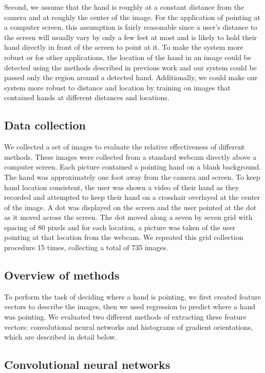 \documentclass[10pt,twocolumn,letterpaper]{article}
\begin{document}
Second, we assume that the hand is roughly at a constant distance from the camera and at roughly the center of the image.  For the application of pointing at a computer screen, this assumption is fairly reasonable since a user's distance to the screen will usually vary by only a few feet at most and is likely to hold their hand directly in front of the screen to point at it.  To make the system more robust or for other applications, the location of the hand in an image could be detected using the methods described in previous work and our system could be passed only the region around a detected hand.  Additionally, we could make our system more robust to distance and location by training on images that contained hands at different distances and locations.

\subsection{Data collection}

We collected a set of images to evaluate the relative effectiveness of different methods.  These images were collected from a standard webcam directly above a computer screen.  Each picture contained a pointing hand on a blank background.  The hand was approximately one foot away from the camera and screen.  To keep hand location consistent, the user was shown a video of their hand as they recorded and attempted to keep their hand on a crosshair overlayed at the center of the image.  A dot was displayed on the screen and the user pointed at the dot as it moved across the screen.  The dot moved along a seven by seven grid with spacing of 80 pixels and for each location, a picture was taken of the user pointing at that location from the webcam.  We repeated this grid collection procedure 15 times, collecting a total of 735 images.


\subsection{Overview of methods}

To perform the task of deciding where a hand is pointing, we first created feature vectors to describe the images, then we used regression to predict where a hand was pointing.  We evaluated two different methods of extracting these feature vectors: convolutional neural networks and histograms of gradient orientations, which are described in detail below.

\subsection{Convolutional neural networks}
\end{document}
